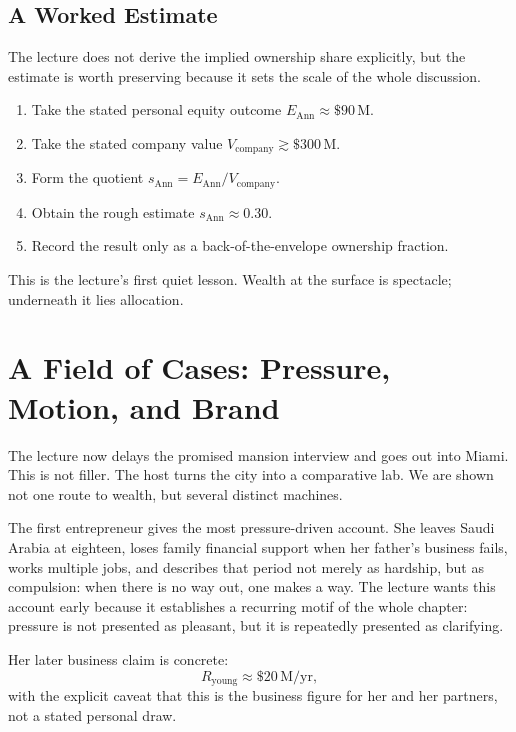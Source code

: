 \subsection{A Worked Estimate}

The lecture does not derive the implied ownership share explicitly, but the estimate is worth preserving because it sets the scale of the whole discussion.

\begin{enumerate}
\item Take the stated personal equity outcome \(E_{\mathrm{Ann}} \approx \$90\,\mathrm{M}\).
\item Take the stated company value \(V_{\mathrm{company}} \gtrsim \$300\,\mathrm{M}\).
\item Form the quotient \(s_{\mathrm{Ann}} = E_{\mathrm{Ann}}/V_{\mathrm{company}}\).
\item Obtain the rough estimate \(s_{\mathrm{Ann}} \approx 0.30\).
\item Record the result only as a back-of-the-envelope ownership fraction.
\end{enumerate}

This is the lecture's first quiet lesson. Wealth at the surface is spectacle; underneath it lies allocation.

\section{A Field of Cases: Pressure, Motion, and Brand}

The lecture now delays the promised mansion interview and goes out into Miami. This is not filler. The host turns the city into a comparative lab. We are shown not one route to wealth, but several distinct machines.

The first entrepreneur gives the most pressure-driven account. She leaves Saudi Arabia at eighteen, loses family financial support when her father's business fails, works multiple jobs, and describes that period not merely as hardship, but as compulsion: when there is no way out, one makes a way. The lecture wants this account early because it establishes a recurring motif of the whole chapter: pressure is not presented as pleasant, but it is repeatedly presented as clarifying.

Her later business claim is concrete:
\begin{equation}
R_{\mathrm{young}} \approx \$20\,\mathrm{M}/\mathrm{yr},
\end{equation}
with the explicit caveat that this is the business figure for her and her partners, not a stated personal draw.

